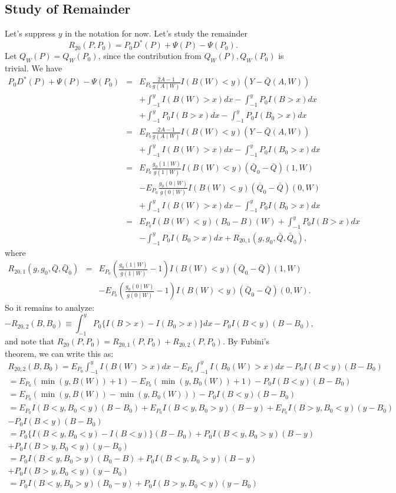 \documentclass[11pt]{article}
\begin{document}
\subsection{Study of Remainder}
Let's suppress $y$ in the notation for now. Let's study the remainder 
\[
R_{20}(P,P_0)=P_0D^*(P)+\Psi(P)-\Psi(P_0).\]
Let $Q_W(P)=Q_W(P_0)$, since the contribution from $Q_W(P),Q_W(P_0)$ is trivial. We have
\begin{eqnarray*}
P_0D^*(P)+\Psi(P)-\Psi(P_0)&=&E_{P_0}
\frac{2A-1}{g(A\mid W)}I(B(W)<y)(Y-\bar{Q}(A,W))\\
&& +\int_{-1}^y I(B(W)>x)dx-\int_{-1}^yP_0I(B>x) dx\\
&&+
\int_{-1}^y P_0I(B>x) dx-\int_{-1}^y P_0I(B_0>x)dx\\
&=& 
E_{P_0}
\frac{2A-1}{g(A\mid W)}I(B(W)<y)(Y-\bar{Q}(A,W))\\
&& +\int_{-1}^y I(B(W)>x)dx-\int_{-1}^y P_0I(B_0>x)dx\\
&=& E_{P_0} \frac{g_0(1\mid W)}{g(1\mid W)}I(B(W)<y)(\bar{Q}_0-\bar{Q})(1,W)\\
&&-E_{P_0}\frac{g_0(0\mid W)}{g(0\mid W)}I(B(W)<y)(\bar{Q}_0-\bar{Q})(0,W)\\
&&+\int_{-1}^y I(B(W)>x)dx-\int_{-1}^y P_0I(B_0>x)dx\\
&=&E_{P_0}I(B(W)<y)(B_0-B)(W)+\int_{-1}^y P_0I(B>x)dx\\
&&-\int_{-1}^y P_0I(B_0>x)dx+R_{20,1}(g,g_0,\bar{Q},\bar{Q}_0),
\end{eqnarray*}
where
\begin{eqnarray*}
R_{20,1}(g,g_0,\bar{Q},\bar{Q}_0)&=& E_{P_0} \left( \frac{g_0(1\mid W)}{g(1\mid W)}-1\right) I(B(W)<y)(\bar{Q}_0-\bar{Q})(1,W)\\
&&-E_{P_0}\left ( \frac{g_0(0\mid W)}{g(0\mid W)}-1\right) I(B(W)<y)(\bar{Q}_0-\bar{Q})(0,W).
\end{eqnarray*}
So it remains to analyze:
\[
-R_{20,2}(B,B_0)\equiv \int_{-1}^y P_0\{I(B>x)-I(B_0>x)\}dx-P_0I(B<y)(B-B_0),\]
and note that $R_{20}(P,P_0)=R_{20,1}(P,P_0)+R_{20,2}(P,P_0)$.
By Fubini's theorem, we can write this as:
\[
\begin{array}{l}
R_{20,2}(B,B_0)=E_{P_0} \int_{-1}^y I(B(W)>x)dx -E_{P_0}\int_{-1}^y I(B_0(W)>x) dx-P_0I(B<y)(B-B_0)\\
=E_{P_0} (\min(y,B(W))+1)-E_{P_0}(\min(y,B_0(W))+1) -P_0I(B<y)(B-B_0)\\
=E_{P_0}(\min(y,B(W))-\min(y,B_0(W))) -P_0I(B<y)(B-B_0)\\
=E_{P_0}I(B<y,B_0<y)(B-B_0)+E_{P_0}I(B<y,B_0>y)(B-y)+E_{P_0}I(B>y,B_0<y)(y-B_0)\\
-P_0I(B<y)(B-B_0)\\
=P_0\{I(B<y,B_0<y)-I(B<y)\}(B-B_0)+P_0I(B<y,B_0>y)(B-y)\\
+P_0I(B>y,B_0<y)(y-B_0)\\
=P_0 I(B<y,B_0>y)(B_0-B)+P_0I(B<y,B_0>y)(B-y)\\
+P_0I(B>y,B_0<y)(y-B_0)\\
=P_0 I(B<y,B_0>y)(B_0-y)+P_0I(B>y,B_0<y)(y-B_0)
\end{array}
\]
\end{document}
